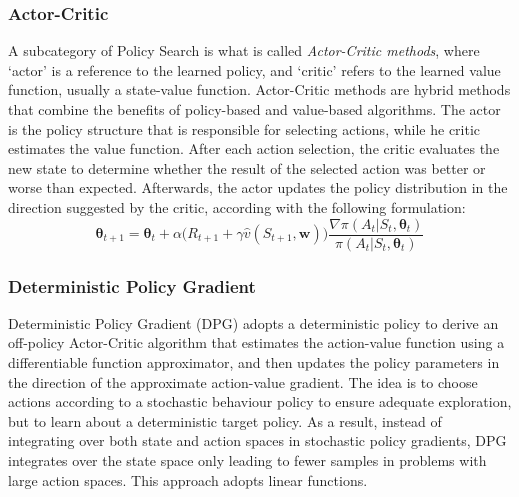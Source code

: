 \subsubsection{Actor-Critic}
A subcategory of Policy Search is what is called \textit{Actor-Critic methods}, where ‘actor’ is a reference to the learned policy, and ‘critic’ refers to the learned value function, usually a state-value function. Actor-Critic methods are hybrid methods that combine the benefits of policy-based and value-based algorithms. The actor is the policy structure that is responsible for selecting actions, while he critic estimates the value function. After each action selection, the critic evaluates the new state to determine whether the result of the selected action was better or worse than expected. Afterwards, the actor updates the policy distribution in the direction suggested by the critic, according with the following formulation:
\begin{equation}
\boldsymbol \theta_{t+1}=\boldsymbol \theta_t + \alpha\bigg( R_{t+1}+\gamma \hat{v}(S_{t+1},\boldsymbol w)\bigg)\frac{\nabla \pi (A_t|S_t,\boldsymbol \theta_t)}{\pi (A_t|S_t,\boldsymbol \theta_t)}
\end{equation}

\subsubsection{Deterministic Policy Gradient}

Deterministic Policy Gradient (DPG) \cite{dpg} adopts a deterministic policy to derive an off-policy Actor-Critic algorithm that estimates the action-value function using a differentiable function approximator, and then updates the policy parameters in the direction of the approximate action-value gradient.
The idea is to choose actions according to a stochastic behaviour policy to ensure adequate exploration, but to learn about a deterministic target policy.
As a result, instead of integrating over both state and action spaces in stochastic policy gradients, DPG integrates over the state space only leading to fewer samples in problems with large action spaces. This approach adopts linear functions.

